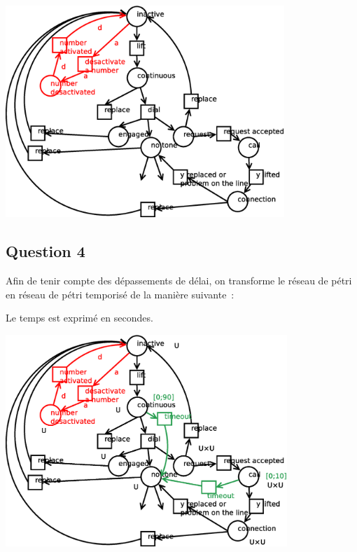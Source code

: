 \begin{center}
\includegraphics[height = 8cm]{exo9_2.eps}
\end{center}
\subsection{Question 4}

Afin de tenir compte des dépassements de délai, on transforme le
réseau de pétri en réseau de pétri temporisé de la manière suivante~:

Le temps est exprimé en secondes.

\begin{center}
\includegraphics[height = 8cm]{exo9_3.eps}
\end{center}
